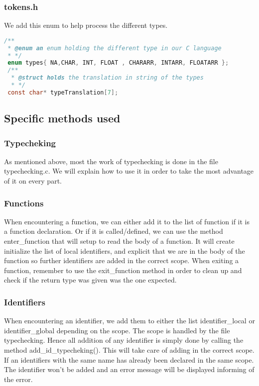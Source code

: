 \documentclass{article}
\begin{document}
\subsubsection{tokens.h}
We add this enum to help process the different types. 
\begin{lstlisting}[language=C]
/**
 * @enum an enum holding the different type in our C language
 * */
 enum types{ NA,CHAR, INT, FLOAT , CHARARR, INTARR, FLOATARR };
 /**
  * @struct holds the translation in string of the types
  * */
 const char* typeTranslation[7];	

\end{lstlisting}

\subsection{Specific methods used}
\subsubsection{Typecheking}
As mentioned above, most the work of typechecking is done in the file typechecking.c. 
We will explain how to use it in order to take the most advantage of it on every part.  
\subsubsection{Functions}
When encountering a function, we can either add it to the list of function if it is a function declaration. Or if it is called/defined, we can use the method enter\_function that will setup to read the body of a function. It will create initialize the list of local identifiers, and explicit that we are in the body of the function so further identifiers are added in the correct scope. 
When exiting a function, remember to use the exit\_function method in order to clean up and check if the return type was given was the one expected. 
\subsubsection{Identifiers}
When encountering an identifier, we add them to either the list identifier\_local or identifier\_global depending on the scope. The scope is handled by the file typechecking. Hence all addition of any identifier is simply done by calling the method add\_id\_typecheking(). This will take care of adding in the correct scope. If an identifiers with the same name has already been declared in the same scope. The identifier won't be added and an error message will be displayed informing of the error. \\
\end{document}
